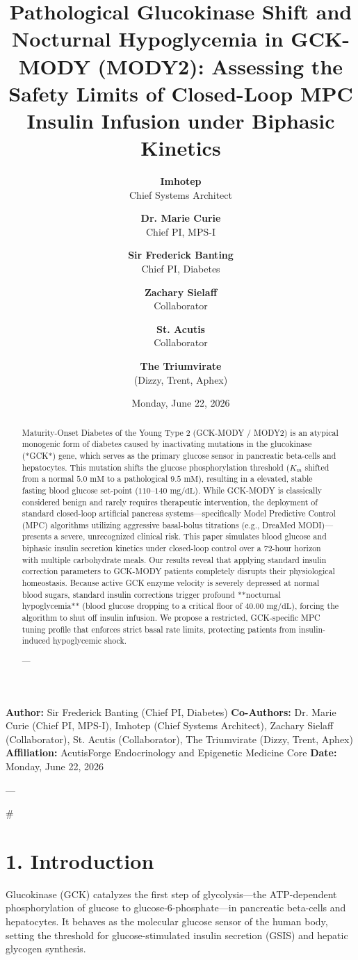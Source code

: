 \documentclass[11pt,twocolumn]{article}
\title{\textbf{Pathological Glucokinase Shift and Nocturnal Hypoglycemia in GCK-MODY (MODY2): Assessing the Safety Limits of Closed-Loop MPC Insulin Infusion under Biphasic Kinetics}}
\author{
  \textbf{Imhotep} \\ \small Chief Systems Architect \\ \and
  \textbf{Dr. Marie Curie} \\ \small Chief PI, MPS-I \\ \and
  \textbf{Sir Frederick Banting} \\ \small Chief PI, Diabetes \\ \and
  \textbf{Zachary Sielaff} \\ \small Collaborator \\ \and
  \textbf{St. Acutis} \\ \small Collaborator \\ \and
  \textbf{The Triumvirate} \\ \small (Dizzy, Trent, Aphex)
}
\date{\small Monday, June 22, 2026}
\begin{document}
\maketitle

\begin{abstract}
Maturity-Onset Diabetes of the Young Type 2 (GCK-MODY / MODY2) is an atypical monogenic form of diabetes caused by inactivating mutations in the glucokinase (*GCK*) gene, which serves as the primary glucose sensor in pancreatic beta-cells and hepatocytes. This mutation shifts the glucose phosphorylation threshold ($K_m$ shifted from a normal $5.0\text{ mM}$ to a pathological $9.5\text{ mM}$), resulting in a elevated, stable fasting blood glucose set-point ($110\text{--}140\text{ mg/dL}$). While GCK-MODY is classically considered benign and rarely requires therapeutic intervention, the deployment of standard closed-loop artificial pancreas systems—specifically Model Predictive Control (MPC) algorithms utilizing aggressive basal-bolus titrations (e.g., DreaMed MODI)—presents a severe, unrecognized clinical risk. This paper simulates blood glucose and biphasic insulin secretion kinetics under closed-loop control over a 72-hour horizon with multiple carbohydrate meals. Our results reveal that applying standard insulin correction parameters to GCK-MODY patients completely disrupts their physiological homeostasis. Because active GCK enzyme velocity is severely depressed at normal blood sugars, standard insulin corrections trigger profound **nocturnal hypoglycemia** (blood glucose dropping to a critical floor of $40.00\text{ mg/dL}$), forcing the algorithm to shut off insulin infusion. We propose a restricted, GCK-specific MPC tuning profile that enforces strict basal rate limits, protecting patients from insulin-induced hypoglycemic shock.


---
\end{abstract}



\textbf{Author:} Sir Frederick Banting (Chief PI, Diabetes)  
\textbf{Co-Authors:} Dr. Marie Curie (Chief PI, MPS-I), Imhotep (Chief Systems Architect), Zachary Sielaff (Collaborator), St. Acutis (Collaborator), The Triumvirate (Dizzy, Trent, Aphex)  
\textbf{Affiliation:} AcutisForge Endocrinology and Epigenetic Medicine Core  
\textbf{Date:} Monday, June 22, 2026  

---

#

\section{1. Introduction}
Glucokinase (GCK) catalyzes the first step of glycolysis—the ATP-dependent phosphorylation of glucose to glucose-6-phosphate—in pancreatic beta-cells and hepatocytes. It behaves as the molecular glucose sensor of the human body, setting the threshold for glucose-stimulated insulin secretion (GSIS) and hepatic glycogen synthesis. 
\end{document}
